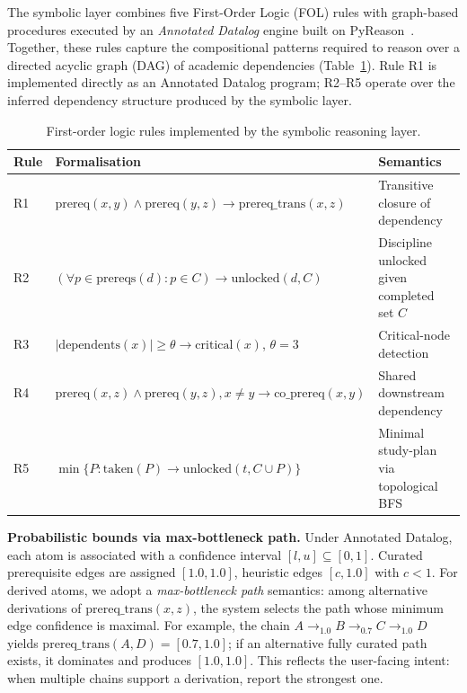 \documentclass[12pt]{article}
\begin{document}
The symbolic layer combines five First-Order Logic (FOL) rules with graph-based procedures executed by an \emph{Annotated Datalog} engine built on PyReason~\cite{aditya2023}. Together, these rules capture the compositional patterns required to reason over a directed acyclic graph (DAG) of academic dependencies (Table~\ref{tab:rules}). Rule R1 is implemented directly as an Annotated Datalog program; R2--R5 operate over the inferred dependency structure produced by the symbolic layer.

\begin{table}[ht]
\centering
\caption{First-order logic rules implemented by the symbolic reasoning layer.}
\label{tab:rules}
\small
\begin{tabular}{lll}
\hline
\textbf{Rule} & \textbf{Formalisation} & \textbf{Semantics} \\
\hline
R1 & $\mathrm{prereq}(x,y) \wedge \mathrm{prereq}(y,z) \rightarrow \mathrm{prereq\_trans}(x,z)$ & Transitive closure of dependency \\
R2 & $(\forall p \in \mathrm{prereqs}(d): p \in C) \rightarrow \mathrm{unlocked}(d, C)$ & Discipline unlocked given completed set $C$ \\
R3 & $|\mathrm{dependents}(x)| \geq \theta \rightarrow \mathrm{critical}(x)$, $\theta=3$ & Critical-node detection \\
R4 & $\mathrm{prereq}(x,z) \wedge \mathrm{prereq}(y,z), x\neq y \rightarrow \mathrm{co\_prereq}(x,y)$ & Shared downstream dependency \\
R5 & $\min\{P: \mathrm{taken}(P) \rightarrow \mathrm{unlocked}(t, C\cup P)\}$ & Minimal study-plan via topological BFS \\
\hline
\end{tabular}
\end{table}

\noindent\textbf{Probabilistic bounds via max-bottleneck path.}
Under Annotated Datalog, each atom is associated with a confidence interval $[l,u]\subseteq[0,1]$. Curated prerequisite edges are assigned $[1.0,1.0]$, heuristic edges $[c,1.0]$ with $c<1$. For derived atoms, we adopt a \emph{max-bottleneck path} semantics: among alternative derivations of $\mathrm{prereq\_trans}(x,z)$, the system selects the path whose minimum edge confidence is maximal. For example, the chain $A \rightarrow_{1.0} B \rightarrow_{0.7} C \rightarrow_{1.0} D$ yields $\mathrm{prereq\_trans}(A,D)=[0.7,1.0]$; if an alternative fully curated path exists, it dominates and produces $[1.0,1.0]$. This reflects the user-facing intent: when multiple chains support a derivation, report the strongest one.
\end{document}
